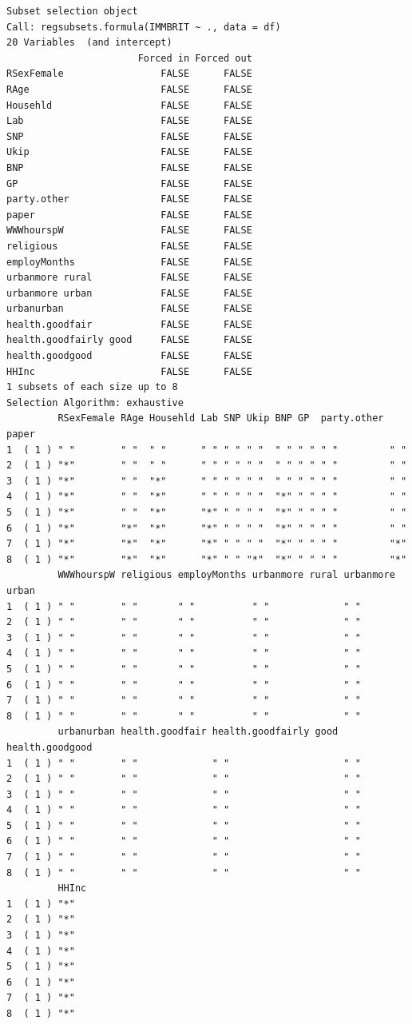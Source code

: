 \documentclass[]{article}
\begin{document}
\begin{verbatim}
Subset selection object
Call: regsubsets.formula(IMMBRIT ~ ., data = df)
20 Variables  (and intercept)
                       Forced in Forced out
RSexFemale                 FALSE      FALSE
RAge                       FALSE      FALSE
Househld                   FALSE      FALSE
Lab                        FALSE      FALSE
SNP                        FALSE      FALSE
Ukip                       FALSE      FALSE
BNP                        FALSE      FALSE
GP                         FALSE      FALSE
party.other                FALSE      FALSE
paper                      FALSE      FALSE
WWWhourspW                 FALSE      FALSE
religious                  FALSE      FALSE
employMonths               FALSE      FALSE
urbanmore rural            FALSE      FALSE
urbanmore urban            FALSE      FALSE
urbanurban                 FALSE      FALSE
health.goodfair            FALSE      FALSE
health.goodfairly good     FALSE      FALSE
health.goodgood            FALSE      FALSE
HHInc                      FALSE      FALSE
1 subsets of each size up to 8
Selection Algorithm: exhaustive
         RSexFemale RAge Househld Lab SNP Ukip BNP GP  party.other paper
1  ( 1 ) " "        " "  " "      " " " " " "  " " " " " "         " "  
2  ( 1 ) "*"        " "  " "      " " " " " "  " " " " " "         " "  
3  ( 1 ) "*"        " "  "*"      " " " " " "  " " " " " "         " "  
4  ( 1 ) "*"        " "  "*"      " " " " " "  "*" " " " "         " "  
5  ( 1 ) "*"        " "  "*"      "*" " " " "  "*" " " " "         " "  
6  ( 1 ) "*"        "*"  "*"      "*" " " " "  "*" " " " "         " "  
7  ( 1 ) "*"        "*"  "*"      "*" " " " "  "*" " " " "         "*"  
8  ( 1 ) "*"        "*"  "*"      "*" " " "*"  "*" " " " "         "*"  
         WWWhourspW religious employMonths urbanmore rural urbanmore urban
1  ( 1 ) " "        " "       " "          " "             " "            
2  ( 1 ) " "        " "       " "          " "             " "            
3  ( 1 ) " "        " "       " "          " "             " "            
4  ( 1 ) " "        " "       " "          " "             " "            
5  ( 1 ) " "        " "       " "          " "             " "            
6  ( 1 ) " "        " "       " "          " "             " "            
7  ( 1 ) " "        " "       " "          " "             " "            
8  ( 1 ) " "        " "       " "          " "             " "            
         urbanurban health.goodfair health.goodfairly good health.goodgood
1  ( 1 ) " "        " "             " "                    " "            
2  ( 1 ) " "        " "             " "                    " "            
3  ( 1 ) " "        " "             " "                    " "            
4  ( 1 ) " "        " "             " "                    " "            
5  ( 1 ) " "        " "             " "                    " "            
6  ( 1 ) " "        " "             " "                    " "            
7  ( 1 ) " "        " "             " "                    " "            
8  ( 1 ) " "        " "             " "                    " "            
         HHInc
1  ( 1 ) "*"  
2  ( 1 ) "*"  
3  ( 1 ) "*"  
4  ( 1 ) "*"  
5  ( 1 ) "*"  
6  ( 1 ) "*"  
7  ( 1 ) "*"  
8  ( 1 ) "*"  
\end{verbatim}
\end{document}
